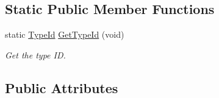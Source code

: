 \subsection*{Static Public Member Functions}
\begin{DoxyCompactItemize}
\item 
static \hyperlink{classns3_1_1TypeId}{Type\+Id} \hyperlink{classns3_1_1TcpSocketBase_a7aa3d6dfe929e6b61ead2217bc5a646a}{Get\+Type\+Id} (void)
\begin{DoxyCompactList}\small\item\em Get the type ID. \end{DoxyCompactList}\end{DoxyCompactItemize}
\subsection*{Public Attributes}
